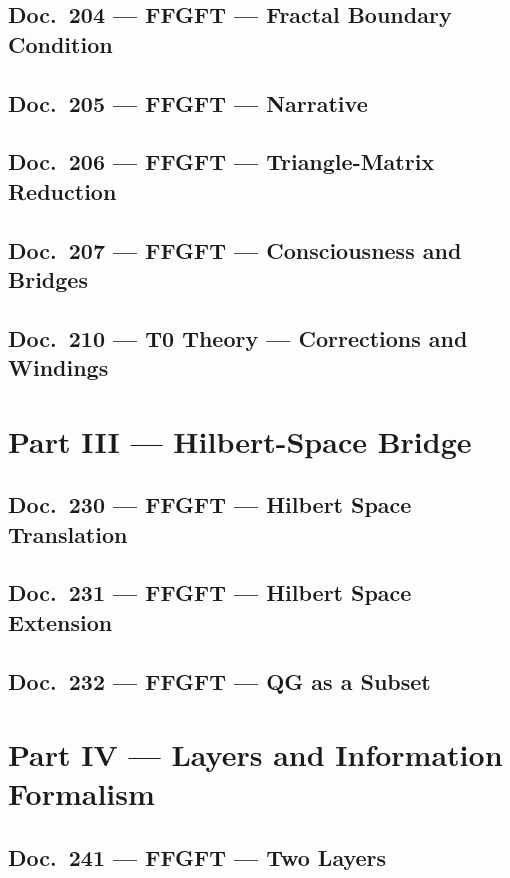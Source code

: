 	\chapter{Doc.~204 --- FFGFT — Fractal Boundary Condition}
	
	\chapter{Doc.~205 --- FFGFT — Narrative}
	
	\chapter{Doc.~206 --- FFGFT — Triangle-Matrix Reduction}
	
	\chapter{Doc.~207 --- FFGFT — Consciousness and Bridges}
	
	\chapter{Doc.~210 --- T0 Theory — Corrections and Windings}
	
	\part{Part III --- Hilbert-Space Bridge}
	\chapter{Doc.~230 --- FFGFT — Hilbert Space Translation}
	
	\chapter{Doc.~231 --- FFGFT — Hilbert Space Extension}
	
	\chapter{Doc.~232 --- FFGFT — QG as a Subset}
	
	\part{Part IV --- Layers and Information Formalism}
	\chapter{Doc.~241 --- FFGFT — Two Layers}
	
